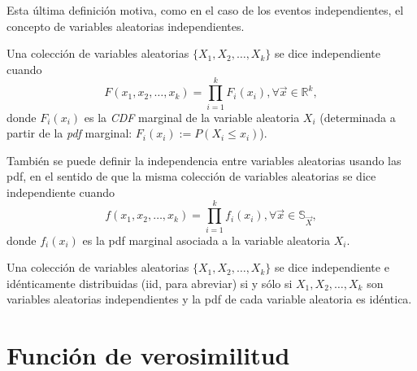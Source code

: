 	Esta última definición motiva, como en el caso de los eventos independientes, el concepto de variables aleatorias independientes.
	
	\begin{defi}
	Una colección de variables aleatorias $\{ X_1,X_2,\dots, X_k\}$ se dice independiente cuando
	$$F(x_1,x_2,\dots,x_k)=\prod_{i=1}^k F_i(x_i), \forall\vec{x}\in\mathbb{R}^k,$$
	donde $F_i(x_i)$ es la \textit{CDF} marginal de la variable aleatoria $X_i$ (determinada a partir de la \textit{pdf} marginal: $F_i(x_i):=P(X_i\leq x_i)$).
	
	También se puede definir la independencia entre variables aleatorias usando las pdf, en el sentido de que la misma colección de variables aleatorias se dice independiente cuando
	$$f(x_1,x_2,\dots,x_k)=\prod_{i=1}^k f_i(x_i), \forall\vec{x}\in\mathbb{S}_{\vec{X}},$$
	donde $f_i(x_i)$ es la pdf marginal asociada a la variable aleatoria $X_i$.
	
	\end{defi}
	
	\begin{defi}
		Una colección de variables aleatorias $\{ X_1,X_2,\dots, X_k\}$ se dice independiente e idénticamente distribuidas (iid, para abreviar) si y sólo si $X_1,X_2,\dots,X_k$ son variables aleatorias independientes y la pdf de cada variable aleatoria es idéntica.
	\end{defi}
	
	\section{Función de verosimilitud}
